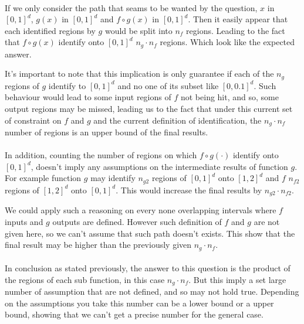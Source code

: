 \paragraph{}
If we only consider the path that seams to be wanted by the question, $x$ in $[0,1]^d$, $g(x)$ in $[0,1]^d$ and
$f \circ g (x)$ in $[0,1]^d$.
Then it easily appear that each identified regions by $g$ would be split into $n_f$ regions.
Leading to the fact that $f \circ g (x)$ identify onto $[0,1]^d$ $n_g \cdot n_f$ regions.
Which look like the expected answer.

It's important to note that this implication is only guarantee if each of the $n_g$ regions of $g$ identify to
$[0,1]^d$ and no one of its subset like $[0,0.1]^d$.
Such behaviour would lead to some input regions of $f$ not being hit, and so, some output regions may be missed, leading
us to the fact that under this current set of constraint on $f$ and $g$ and the current definition of identification,
the $n_g \cdot n_f$ number of regions is an upper bound of the final results.

\paragraph{}
In addition, counting the number of regions on which $f \circ g (\cdot)$ identify onto $[0,1]^d$, doesn't imply any
assumptions on the intermediate results of function $g$.
For example function $g$ may identify $n_{g2}$ regions of $[0,1]^d$ onto $[1,2]^d$ and $f$ $n_{f2}$ regions of $[1,2]^d$
onto $[0,1]^d$.
This would increase the final results by $n_{g2} \cdot n_{f2}$.

We could apply such a reasoning on every none overlapping intervals where $f$ inputs and $g$ outputs are defined.
However such definition of $f$ and $g$ are not given here, so we can't assume that such path doesn't exists.
This show that the final result may be higher than the previously given $n_g \cdot n_f$.

\paragraph{}
In conclusion as stated previously, the answer to this question is the product of the regions of each sub function,
in this case $n_g \cdot n_f$.
But this imply a set large number of assumption that are not defined, and so may not hold true.
Depending on the assumptions you take this number can be a lower bound or a upper bound, showing that we can't get a
precise number for the general case.


